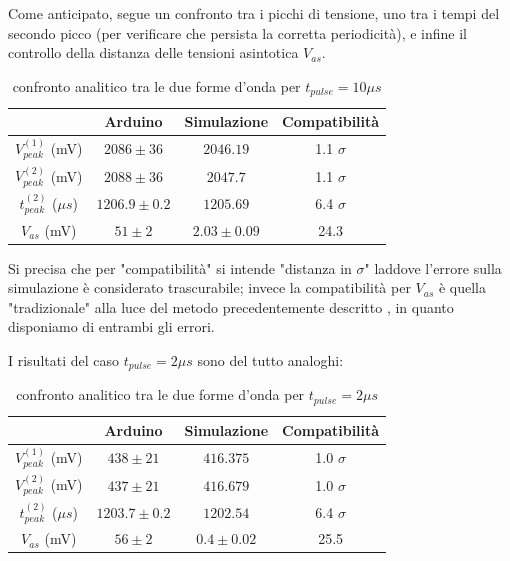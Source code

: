 \documentclass{article}
\begin{document}
Come anticipato, segue un confronto tra i picchi di tensione, uno tra i tempi del secondo picco (per verificare che persista la corretta periodicità),
e infine il controllo della distanza delle tensioni asintotica $V_{as}$. 

\begin{table}[H]
    \centering
    \begin{tabular}{cccc}
        \toprule
                        & Arduino & Simulazione & Compatibilità \\
        \midrule
        $V_{peak}^{(1)}$ (mV)&   $2086 \pm 36$ & $2046.19$ & 1.1 $\sigma$\\
        $V_{peak}^{(2)}$ (mV)&   $2088 \pm 36$ & $2047.7$ & 1.1 $\sigma$\\
        $t_{peak}^{(2)}$ ($\mu s$)&   $1206.9 \pm 0.2$ & $1205.69$ & 6.4 $\sigma$\\
        $V_{as}$       (mV)&   $51 \pm 2$ & $2.03 \pm 0.09$ & 24.3 \\
        \bottomrule
    \end{tabular}
    \caption{confronto analitico tra le due forme d'onda per $t_{pulse}=10 \mu s$}
\end{table}

Si  precisa che per "compatibilità" si intende "distanza in $\sigma$" laddove l'errore sulla simulazione è considerato trascurabile; invece 
la compatibilità per $V_{as}$ è quella "tradizionale" alla luce del metodo
precedentemente descritto , in quanto disponiamo di entrambi gli errori.

I risultati del caso $t_{pulse}=2 \mu s$ sono del tutto analoghi:

\begin{table}[H]
    \centering
    \begin{tabular}{cccc}
        \toprule
                        & Arduino & Simulazione & Compatibilità \\
        \midrule
        $V_{peak}^{(1)}$ (mV)&   $438 \pm 21$ & $416.375$ & 1.0 $\sigma$\\
        $V_{peak}^{(2)}$ (mV)&   $437 \pm 21$ & $416.679$ & 1.0 $\sigma$\\
        $t_{peak}^{(2)}$ ($\mu s$)&   $1203.7 \pm 0.2$ & $1202.54$ & 6.4 $\sigma$\\
        $V_{as}$       (mV)&   $56 \pm 2$ & $0.4 \pm 0.02$ & 25.5 \\
        \bottomrule
    \end{tabular}
    \caption{confronto analitico tra le due forme d'onda per $t_{pulse}=2 \mu s$}
\end{table}
\end{document}
